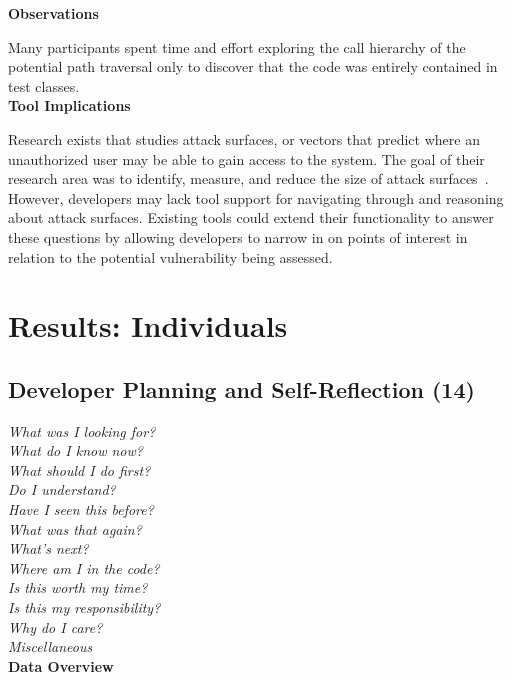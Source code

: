 \documentclass[conference]{IEEEtran}
\begin{document}
\noindent\textbf{Observations}

Many participants spent time and effort exploring the call hierarchy of the potential path traversal only to discover that the code was entirely contained in test classes.
\\

\noindent\textbf{Tool Implications}

Research exists that studies attack surfaces, or vectors that predict where an unauthorized user may be able to gain access to the system.
The goal of their research area was to identify, measure, and reduce the size of attack surfaces~\cite{manadhata2011attack, bartel2012automatically}. 
However, developers may lack tool support for navigating through and reasoning about attack surfaces.
Existing tools could extend their functionality to answer these questions by allowing developers to narrow in on points of interest in relation to the potential vulnerability being assessed.



\section{Results: Individuals}
\label{sec:results-i}



\noindent\subsection{\textbf{Developer Planning and Self-Reflection (14)}} \label{dpr}

\noindent\emph{What was I looking for?} \\
\emph{What do I know now?} \\
\emph{What should I do first?} \\
\emph{Do I understand?} \\
\emph{Have I seen this before?} \\
\emph{What was that again?} \\
\emph{What's next?} \\
\emph{Where am I in the code?} \\
\emph{Is this worth my time?} \\
\emph{Is this my responsibility?} \\
\emph{Why do I care?} \\
\emph{Miscellaneous} \\

\noindent\textbf{Data Overview}
\end{document}

